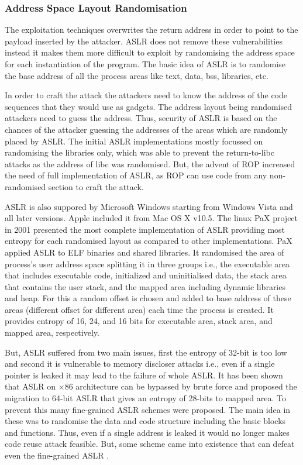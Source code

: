 \documentclass{article}
\begin{document}
\begin{multicols}{2}
	\subsubsection{Address Space Layout Randomisation}
	The exploitation techniques overwrites the return address in order to point to the payload inserted by the attacker. ASLR does not remove these vulnerabilities instead it makes them more difficult to exploit by randomising the address space for each instantiation of the program. The basic idea of ASLR is to randomise the base address of all the process areas like text, data, bss, libraries, etc.
	
	In order to craft the attack the attackers need to know the address of the code sequences that they would use as gadgets. The address layout being randomised attackers need to guess the address. Thus, security of ASLR is based on the chances of the attacker guessing the addresses of the areas which are randomly placed by ASLR. The initial ASLR implementations mostly focussed on randomising the libraries only, which was able to prevent the return-to-libc attacks as the address of libc was randomised. But, the advent of ROP increased the need of full implementation of ASLR, as ROP can use code from any non-randomised section to craft the attack.
	
	ASLR is also suppored by Microsoft Windows starting from Windows Vista and all later versions. Apple included it from Mac OS X v10.5. The linux PaX project \cite{pax} in 2001 presented the most complete implementation of ASLR providing most entropy for each randomised layout as compared to other implementations. PaX applied ASLR to ELF binaries and shared libraries. It randomised the area of process's user address space splitting it in three groups i.e., the executable area that includes executable code, initialized and uninitialised data, the stack area that contains the user stack, and the mapped area including dynamic libraries and heap. For this a random offset is chosen and added to base address of these areas (different offset for different area) each time the process is created. It provides entropy of 16, 24, and 16 bits for executable area, stack area, and mapped area, respectively.
	
	But, ASLR suffered from two main issues, first the entropy of 32-bit is too low and second it is vulnerable to memory discloser attacks i.e., even if a single pointer is leaked it may lead to the failure of whole ASLR. It has been shown that ASLR on $\times$86 architecture can be bypassed by brute force \cite{effaslr} and proposed the migration to 64-bit ASLR that gives an entropy of 28-bits to mapped area. To prevent this many fine-grained ASLR schemes were proposed. The main idea in these was to randomise the data and code structure including the basic blocks and functions. Thus, even if a single address is leaked it would no longer makes code reuse attack feasible. But, some scheme came into existence that can defeat even the fine-grained ASLR \cite{jitrop}.
	

\end{multicols}
\end{document}
